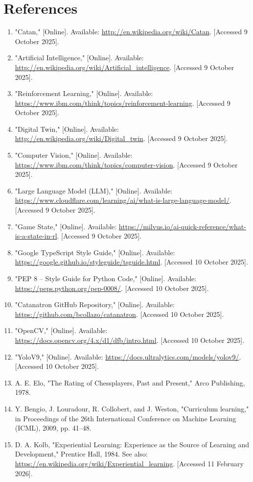 \documentclass{article}
\begin{document}
\section*{References}
\begin{enumerate}
    \item "Catan," [Online]. Available: \url{http://en.wikipedia.org/wiki/Catan}. [Accessed 9 October 2025].
    \item "Artificial Intelligence," [Online]. Available: \url{http://en.wikipedia.org/wiki/Artificial_intelligence}. [Accessed 9 October 2025].
    \item "Reinforcement Learning," [Online]. Available: \url{https://www.ibm.com/think/topics/reinforcement-learning}. [Accessed 9 October 2025].
    \item "Digital Twin," [Online]. Available: \url{http://en.wikipedia.org/wiki/Digital_twin}. [Accessed 9 October 2025].
    \item "Computer Vision," [Online]. Available: \url{https://www.ibm.com/think/topics/computer-vision}. [Accessed 9 October 2025].
    \item "Large Language Model (LLM)," [Online]. Available: \url{https://www.cloudflare.com/learning/ai/what-is-large-language-model/}. [Accessed 9 October 2025].
    \item "Game State," [Online]. Available: \url{https://milvus.io/ai-quick-reference/what-is-a-state-in-rl}. [Accessed 9 October 2025].
    \item "Google TypeScript Style Guide," [Online]. Available: \url{https://google.github.io/styleguide/tsguide.html}. [Accessed 10 October 2025].
    \item "PEP 8 -- Style Guide for Python Code," [Online]. Available: \url{https://peps.python.org/pep-0008/}. [Accessed 10 October 2025].
    \item "Catanatron GitHub Repository," [Online]. Available: \url{https://github.com/bcollazo/catanatron}. [Accessed 10 October 2025].
    \item "OpenCV," [Online]. Available: \url{https://docs.opencv.org/4.x/d1/dfb/intro.html}. [Accessed 10 October 2025].
    \item "YoloV9," [Online]. Available: \url{https://docs.ultralytics.com/models/yolov9/}. [Accessed 10 October 2025].
    \item A. E. Elo, "The Rating of Chessplayers, Past and Present," Arco Publishing, 1978.
    \item Y. Bengio, J. Louradour, R. Collobert, and J. Weston, "Curriculum learning," in Proceedings of the 26th International Conference on Machine Learning (ICML), 2009, pp. 41–48.
    \item D. A. Kolb, "Experiential Learning: Experience as the Source of Learning and Development," Prentice Hall, 1984. See also: \url{https://en.wikipedia.org/wiki/Experiential_learning}. [Accessed 11 February 2026].
\end{enumerate}
\newpage{}
\end{document}
